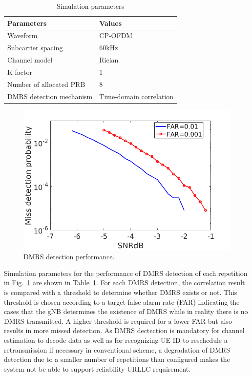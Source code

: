\documentclass[conference]{IEEEtran}
\begin{document}
\begin{table}[htbp]
\caption{Simulation parameters}
\begin{center}
\begin{tabular}{|p{8em}|p{8em}|}
 \hline
 \textbf{Parameters} & \textbf{Values}\\
 \hline
 Waveform & CP-OFDM\\
 \hline
 Subcarrier spacing & 60kHz\\
 \hline
 Channel model & Rician\\
 \hline
 K factor & 1\\
 \hline
 Number of allocated PRB & 8\\
 \hline
 DMRS detection mechanism & Time-domain correlation\\
 

 
 \hline
\end{tabular}
\label{tab2}
\end{center}
\vspace{-6mm}
\end{table}

\begin{figure}[htbp]
\centerline{\includegraphics[scale=0.25]{fig2.png}}
\caption{DMRS detection performance.}
\label{fig5}
\vspace{-7mm}
\end{figure}

Simulation parameters for the performance of DMRS detection of each repetition in Fig.~\ref{fig5} are shown in Table~\ref{tab2}. For each DMRS detection, the correlation result is compared with a threshold to determine whether DMRS exists or not. This threshold is chosen according to a target false alarm rate (FAR) indicating the cases that the gNB determines the existence of DMRS while in reality there is no DMRS transmitted. A higher threshold is required for a lower FAR but also results in more missed detection. As DMRS dectection is mandatory for channel estimation to decode data as well as for recognizing UE ID to reschedule a retransmission if necessary in conventional scheme, a degradation of DMRS detection due to a smaller number of repetitions than configured makes the system not be able to support reliability URLLC requirement.
\end{document}
